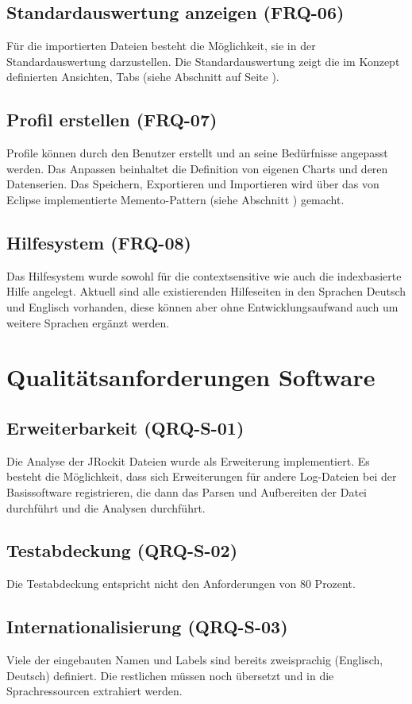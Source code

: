 \subsection{Standardauswertung anzeigen (FRQ-06)}
Für die importierten Dateien besteht die Möglichkeit, sie in der Standardauswertung darzustellen. Die Standardauswertung zeigt die im Konzept definierten Ansichten, Tabs (siehe Abschnitt  auf Seite \pageref{standardreport}).

\subsection{Profil erstellen (FRQ-07)}
Profile können durch den Benutzer erstellt und an seine Bedürfnisse angepasst werden. Das Anpassen beinhaltet die Definition von eigenen Charts und deren Datenserien. Das Speichern, Exportieren und Importieren wird über das von Eclipse implementierte Memento-Pattern (siehe Abschnitt ) gemacht.

\subsection{Hilfesystem (FRQ-08)}
Das Hilfesystem wurde sowohl für die contextsensitive wie auch die indexbasierte Hilfe angelegt. Aktuell sind alle existierenden Hilfeseiten in den Sprachen Deutsch und Englisch vorhanden, diese können aber ohne Entwicklungsaufwand auch um weitere Sprachen ergänzt werden. 

\section{Qualitätsanforderungen Software}
\subsection{Erweiterbarkeit (QRQ-S-01)}
Die Analyse der JRockit Dateien wurde als Erweiterung implementiert. Es besteht die Möglichkeit, dass sich Erweiterungen für andere Log-Dateien bei der Basissoftware registrieren, die dann das Parsen und Aufbereiten der Datei durchführt und die Analysen durchführt.

\subsection{Testabdeckung (QRQ-S-02)}
Die Testabdeckung entspricht nicht den Anforderungen von 80 Prozent. 

\subsection{Internationalisierung (QRQ-S-03)}
Viele der eingebauten Namen und Labels sind bereits zweisprachig (Englisch, Deutsch) definiert. Die restlichen müssen noch übersetzt und in die Sprachressourcen extrahiert werden.

